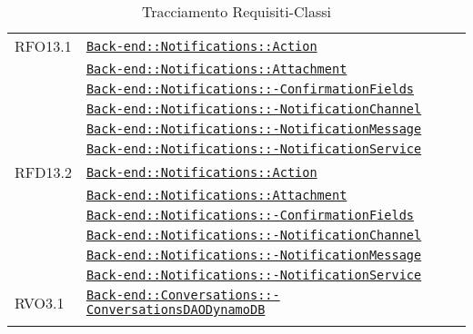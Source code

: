 \begin{longtable}{|>{\centering}m{3cm}|m{10cm}<{\centering}|}
RFO13.1 & \hyperref[Back-end::Notifications::Action]{\texttt{Back-end::Notifications::Action}}\\
& \hyperref[Back-end::Notifications::Attachment]{\texttt{Back-end::Notifications::Attachment}}\\
& \hyperref[Back-end::Notifications::ConfirmationFields]{\texttt{Back-end::Notifications::-\linebreak ConfirmationFields}}\\
& \hyperref[Back-end::Notifications::NotificationChannel]{\texttt{Back-end::Notifications::-\linebreak NotificationChannel}}\\
& \hyperref[Back-end::Notifications::NotificationMessage]{\texttt{Back-end::Notifications::-\linebreak NotificationMessage}}\\
& \hyperref[Back-end::Notifications::NotificationService]{\texttt{Back-end::Notifications::-\linebreak NotificationService}}\\ \hline

RFD13.2 & \hyperref[Back-end::Notifications::Action]{\texttt{Back-end::Notifications::Action}}\\
& \hyperref[Back-end::Notifications::Attachment]{\texttt{Back-end::Notifications::Attachment}}\\
& \hyperref[Back-end::Notifications::ConfirmationFields]{\texttt{Back-end::Notifications::-\linebreak ConfirmationFields}}\\
& \hyperref[Back-end::Notifications::NotificationChannel]{\texttt{Back-end::Notifications::-\linebreak NotificationChannel}}\\
& \hyperref[Back-end::Notifications::NotificationMessage]{\texttt{Back-end::Notifications::-\linebreak NotificationMessage}}\\
& \hyperref[Back-end::Notifications::NotificationService]{\texttt{Back-end::Notifications::-\linebreak NotificationService}}\\ \hline

RVO3.1 & \hyperref[Back-end::Conversations::ConversationsDAODynamoDB]{\texttt{Back-end::Conversations::-\linebreak ConversationsDAODynamoDB}}\\ \hline

\caption[Tracciamento Requisiti-Classi]{Tracciamento Requisiti-Classi}
\label{tabella:requi-class}
\end{longtable}
\clearpage
